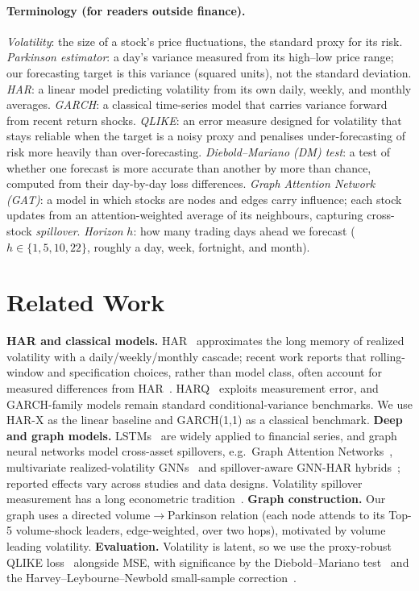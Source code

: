 \documentclass[runningheads]{llncs}
\begin{document}
\paragraph{Terminology (for readers outside finance).}
\emph{Volatility}: the size of a stock's price fluctuations, the standard proxy for its risk.
\emph{Parkinson estimator}: a day's variance measured from its high--low price range; our forecasting target is
this variance (squared units), not the standard deviation.
\emph{HAR}: a linear model predicting volatility from its own daily, weekly, and monthly averages.
\emph{GARCH}: a classical time-series model that carries variance forward from recent return shocks.
\emph{QLIKE}: an error measure designed for volatility that stays reliable when the target is a noisy proxy and
penalises under-forecasting of risk more heavily than over-forecasting.
\emph{Diebold--Mariano (DM) test}: a test of whether one forecast is more accurate than another by more than
chance, computed from their day-by-day loss differences.
\emph{Graph Attention Network (GAT)}: a model in which stocks are nodes and edges carry influence; each stock
updates from an attention-weighted average of its neighbours, capturing cross-stock \emph{spillover}.
\emph{Horizon} $h$: how many trading days ahead we forecast ($h\in\{1,5,10,22\}$, roughly a day, week, fortnight,
and month).

\section{Related Work}
\textbf{HAR and classical models.} HAR~\cite{corsi2009} approximates the long memory of realized volatility
with a daily/weekly/monthly cascade; recent work reports that rolling-window and specification choices, rather
than model class, often account for measured differences from HAR~\cite{audrino2025}. HARQ~\cite{harq2016}
exploits measurement error, and GARCH-family models remain standard conditional-variance benchmarks. We use
HAR-X as the linear baseline and GARCH(1,1) as a classical benchmark. \textbf{Deep and graph models.} LSTMs~\cite{lstm1997} are widely applied to
financial series, and graph neural networks model cross-asset spillovers, e.g.\ Graph Attention
Networks~\cite{gat2018}, multivariate realized-volatility GNNs~\cite{chen2022} and spillover-aware GNN-HAR
hybrids~\cite{gnnhar2025}; reported effects vary across studies and data designs. Volatility spillover
measurement has a long econometric tradition~\cite{dy2012}. \textbf{Graph construction.} Our graph uses a
directed volume$\to$Parkinson relation (each node attends to its Top-5 volume-shock leaders, edge-weighted,
over two hops), motivated by volume leading volatility. \textbf{Evaluation.} Volatility is latent, so we use
the proxy-robust QLIKE loss~\cite{patton2011} alongside MSE, with significance by the Diebold--Mariano
test~\cite{dm1995} and the Harvey--Leybourne--Newbold small-sample correction~\cite{hln1997}.
\end{document}
